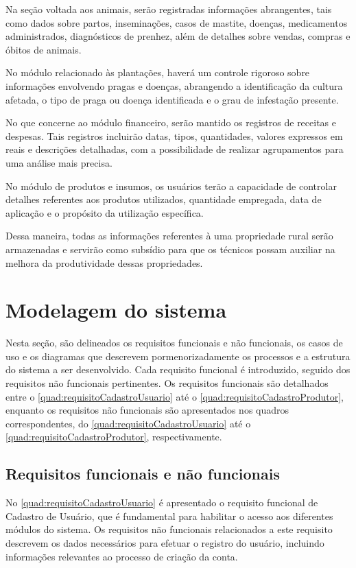 Na seção voltada aos animais, serão registradas informações abrangentes, tais como dados sobre partos, inseminações, casos de mastite, doenças, medicamentos administrados, diagnósticos de prenhez, além de detalhes sobre vendas, compras e óbitos de animais.

No módulo relacionado às plantações, haverá um controle rigoroso sobre informações envolvendo pragas e doenças, abrangendo a identificação da cultura afetada, o tipo de praga ou doença identificada e o grau de infestação presente.

No que concerne ao módulo financeiro, serão mantido os registros de receitas e despesas. Tais registros incluirão datas, tipos, quantidades, valores expressos em reais e descrições detalhadas, com a possibilidade de realizar agrupamentos para uma análise mais precisa.

No módulo de produtos e insumos, os usuários terão a capacidade de controlar detalhes referentes aos produtos utilizados, quantidade empregada, data de aplicação e o propósito da utilização específica.

Dessa maneira, todas as informações referentes à uma propriedade rural serão armazenadas e servirão como subsídio para que os técnicos possam auxiliar na melhora da produtividade dessas propriedades.

\section{Modelagem do sistema}\label{sec:modelagemSistema}

Nesta seção, são delineados os requisitos funcionais e não funcionais, os casos de uso e os diagramas que descrevem pormenorizadamente os processos e a estrutura do sistema a ser desenvolvido. Cada requisito funcional é introduzido, seguido dos requisitos não funcionais pertinentes.
Os requisitos funcionais são detalhados entre o \autoref{quad:requisitoCadastroUsuario} até o \autoref{quad:requisitoCadastroProdutor}, enquanto os requisitos não funcionais são apresentados nos quadros correspondentes, do \autoref{quad:requisitoCadastroUsuario} até o \autoref{quad:requisitoCadastroProdutor}, respectivamente.

\subsection{Requisitos funcionais e não funcionais}\label{subsec:requisitosFuncionaisNaoFuncionais}

No \autoref{quad:requisitoCadastroUsuario} é apresentado o requisito funcional de Cadastro de Usuário, que é fundamental para habilitar o acesso aos diferentes módulos do sistema. Os requisitos não funcionais relacionados a este requisito descrevem os dados necessários para efetuar o registro do usuário, incluindo informações relevantes ao processo de criação da conta.

